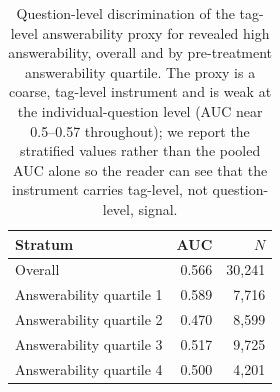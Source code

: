 \begin{table}[ht]
\centering
\caption{Question-level discrimination of the tag-level answerability proxy for revealed high answerability, overall and by pre-treatment answerability quartile. The proxy is a coarse, tag-level instrument and is weak at the individual-question level (AUC near 0.5--0.57 throughout); we report the stratified values rather than the pooled AUC alone so the reader can see that the instrument carries tag-level, not question-level, signal.}
\label{tab:auc_stratum}
\small
\begin{tabular}{lrr}
\toprule
Stratum & AUC & $N$ \\
\midrule
Overall & 0.566 & 30,241 \\
Answerability quartile 1 & 0.589 & 7,716 \\
Answerability quartile 2 & 0.470 & 8,599 \\
Answerability quartile 3 & 0.517 & 9,725 \\
Answerability quartile 4 & 0.500 & 4,201 \\
\bottomrule
\end{tabular}
\end{table}